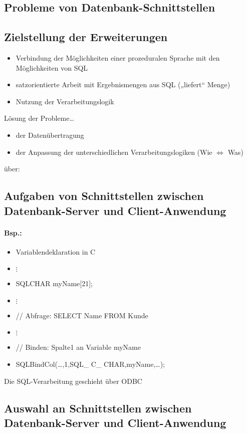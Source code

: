 \subsection{Probleme von Datenbank-Schnittstellen}
\subsection{Zielstellung der Erweiterungen}
\begin{itemize}
\item Verbindung der Möglichkeiten einer prozeduralen Sprache mit den Möglichkeiten von SQL
\item satzorientierte Arbeit mit Ergebnismengen aus SQL („liefert“ Menge)
\item Nutzung der Verarbeitungslogik
\end{itemize}
Lösung der Probleme…
\begin{itemize}
\item der Datenübertragung
\item der Anpassung der unterschiedlichen Verarbeitungslogiken (Wie $\Leftrightarrow$ Was)
\end{itemize}
über:
\subsection{Aufgaben von Schnittstellen zwischen Datenbank-Server und Client-Anwendung}
\paragraph{Bsp.:}
\begin{itemize}
\item Variablendeklaration in C
\item $\vdots$
\item SQLCHAR myName[21];
\item $\vdots$
\item // Abfrage: SELECT Name FROM Kunde
\item $\vdots$
\item // Binden: Spalte1 an Variable myName
\item SQLBindCol(…,1,SQL\_ C\_ CHAR,myName,…);
\end{itemize}
Die SQL-Verarbeitung geschieht über ODBC
\subsection{Auswahl an Schnittstellen zwischen Datenbank-Server und Client-Anwendung}
